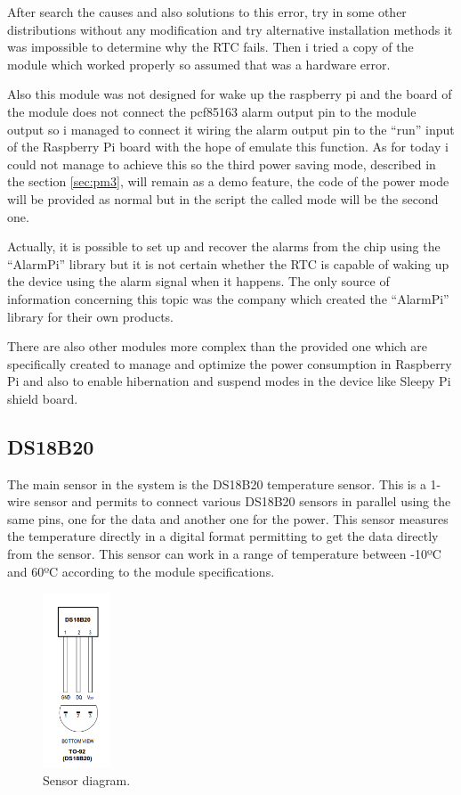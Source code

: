 			After search the causes and also solutions to this error, try in some other distributions without any modification and try alternative installation methods it was impossible to determine why the RTC fails. Then i tried a copy of the module which worked properly so assumed that was a hardware error.

			Also this module was not designed for wake up the raspberry pi and the board of the module does not connect the pcf85163 alarm output pin to the module output so i managed to connect it wiring the alarm output pin to the ``run'' input of the Raspberry Pi board with the hope of emulate this function. As for today i could not manage to achieve this so the third power saving mode, described in the section \ref{sec:pm3}, will remain as a demo feature, the code of the power mode will be provided as normal but in the script the called mode will be the second one.

			Actually, it is possible to set up and recover the alarms from the chip using the ``AlarmPi'' library but it is not certain whether the RTC is capable of waking up the device using the alarm signal when it happens. The only source of information concerning this topic was the company which created the ``AlarmPi'' library for their own products.

			There are also other modules more complex than the provided one which are specifically created to manage and optimize the power consumption in Raspberry Pi and also to enable hibernation and suspend modes in the device like Sleepy Pi shield board.
		\subsection{DS18B20}\label{sec:ds18b20}

		The main sensor in the system is the DS18B20 temperature sensor. This is a 1-wire sensor and permits to connect various DS18B20 sensors in parallel using the same pins, one for the data and another one for the power. This sensor measures the temperature directly in a digital format permitting to get the data directly from the sensor. This sensor can work in a range of temperature between -10ºC and 60ºC according to the module specifications.

		\begin{figure}[h!]
		\includegraphics[width=2cm]{fig/ds18b20.png}
		\centering
		\caption{Sensor diagram.\label{fig:ds18b20}}
		\end{figure}

